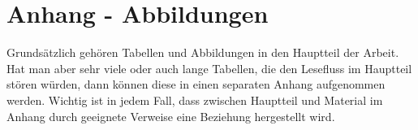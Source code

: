 
\clearpage
\chapter{Anhang - Abbildungen}

Grundsätzlich gehören Tabellen und Abbildungen in den Hauptteil der Arbeit.
Hat man aber sehr viele oder auch lange Tabellen, die den Lesefluss im Hauptteil
stören würden, dann können diese in einen separaten Anhang aufgenommen werden.
Wichtig ist in jedem Fall, dass zwischen Hauptteil und Material im Anhang durch
geeignete Verweise eine Beziehung hergestellt wird.
